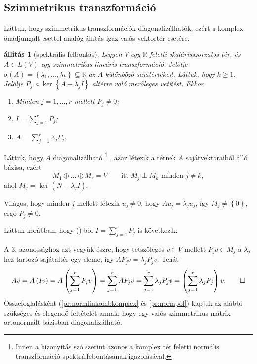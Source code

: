 \documentclass[9pt, a4paper, showtrims]{memoir}
\makeatletter
\renewenvironment{proof}[1][\proofname]
    {\par\pushQED{\qed}%
    \normalfont \topsep6\p@\@plus6\p@\relax
    \trivlist
    \item[\hskip\labelsep
        \itshape
    #1\@addpunct{:}]\ignorespaces}
    {\popQED\endtrivlist\@endpefalse}
\theoremstyle{plain}
\newtheorem{proposition}{állítás}[chapter]
\theoremstyle{remark}
\theoremstyle{definition}
\makeatother
\begin{document}
\subsection{Szimmetrikus transzformáció}
Láttuk, hogy szimmetrikus transzformációk diagonalizálhatók,
ezért a komplex önadjungált esettel analóg állítás igaz valós vektortér esetére.
\begin{proposition}[spektrális felbontás]
	Legyen $V$ egy $\mathbb{R}$ feletti skalárisszorzatos-tér, és $A\in L\left( V \right)$
	egy szimmetrikus lineáris transzformáció.
	Jelölje $\sigma\left( A \right)=\left\{\lambda_1,\ldots,\lambda_k  \right\}\subseteq\mathbb{R}$ az $A$ különböző sajátértékeit.
	Láttuk, hogy $k\geq 1$.
	Jelölje $P_j$ a $\ker\left\{ A-\lambda_jI \right\}$ altérre való merőleges vetítést.
	Ekkor
	\begin{enumerate}
		\item Minden $j=1,\ldots,r$ mellett $P_j\neq 0$;
		\item $I=\sum_{j=1}^rP_j$;
		\item $A=\sum_{j=1}^r\lambda_jP_j$.
		      \qedhere
	\end{enumerate}
\end{proposition}
\begin{proof}
	Láttuk, hogy $A$ diagonalizálható
	\footnote{Innen a bizonyítás szó szerint azonos a komplex tér feletti normális transzformáció spektrálfebontásának igazolásával.}%
	, azaz létezik a térnek $A$ sajátvektoraiból álló
	bázisa,
	ezért
	\[
		M_1\oplus\dots\oplus M_r=V
		\qquad\text{itt }M_j\perp M_k\text{ minden }j\neq k,\tag{\dag}
	\]
	ahol $M_j=\ker\left( N-\lambda_jI \right)$.

	Világos,
	hogy minden $j$ mellett létezik $u_j\neq 0$, hogy $Au_j=\lambda_ju_j$,
	így $M_j\neq \left\{ 0 \right\}$,
	ergo $P_j\neq 0.$

	Láttuk korábban, hogy (\dag)-ből $I=\sum_{j=1}^{r}P_j$ is következik.

	A 3. azonossághoz azt vegyük észre,
	hogy tetszőleges $v\in V$ mellett $P_jv\in M_j$ a $\lambda_j$-hez tartozó sajátaltér egy eleme,
	így $AP_jv=\lambda_jP_jv$. Tehát
	\[
		Av
		=
		A\left( Iv \right)
		=
		A\left( \sum_{j=1}^rP_jv \right)
		=
		\sum_{j=1}^rAP_jv
		=
		\sum_{j=1}^r\lambda_jP_jv
		=
		\left( \sum_{j=1}^r\lambda_jP_j \right)v.
		\qedhere
	\]
\end{proof}
Összefoglalásként (\ref{pr:normlinkombkomplex} és \ref{pr:normpol}) kapjuk az alábbi szükséges és elegendő feltételét annak,
hogy egy valós szimmetrikus mátrix ortonormált bázisban diagonalizálható.
\end{document}
